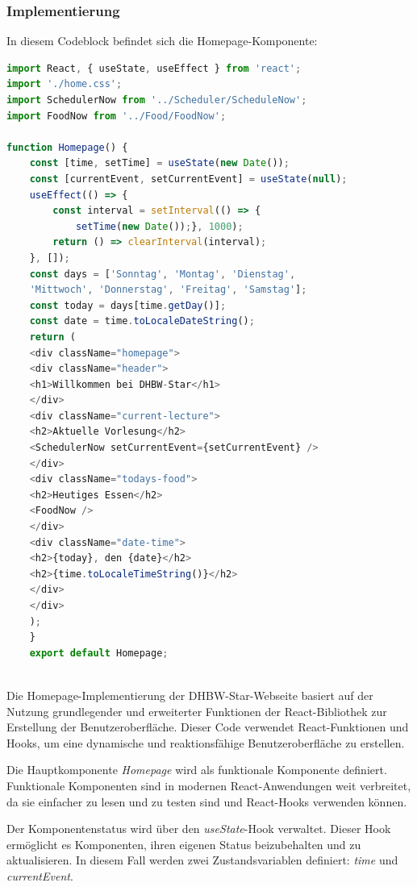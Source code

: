 \subsubsection{Implementierung}
In diesem Codeblock befindet sich die Homepage-Komponente:
\begin{lstlisting}[language=JavaScript,
	frame=single,           % Ein Rahmen um den Code
	framexleftmargin=15pt,  % Rahmen link von den Zahlen
	style=algoBericht,
	label={Homepage-Komponente},
	captionpos=b ,          % Caption unter den Code setzen
	caption={Homepage-Komponente}]
import React, { useState, useEffect } from 'react';
import './home.css';
import SchedulerNow from '../Scheduler/ScheduleNow';
import FoodNow from '../Food/FoodNow';

function Homepage() {
	const [time, setTime] = useState(new Date());
	const [currentEvent, setCurrentEvent] = useState(null);
	useEffect(() => {
		const interval = setInterval(() => {
			setTime(new Date());}, 1000);
		return () => clearInterval(interval);
	}, []);
	const days = ['Sonntag', 'Montag', 'Dienstag', 
	'Mittwoch', 'Donnerstag', 'Freitag', 'Samstag'];
	const today = days[time.getDay()];
	const date = time.toLocaleDateString();
	return (
	<div className="homepage">
	<div className="header">
	<h1>Willkommen bei DHBW-Star</h1>
	</div>
	<div className="current-lecture">
	<h2>Aktuelle Vorlesung</h2>
	<SchedulerNow setCurrentEvent={setCurrentEvent} />
	</div>
	<div className="todays-food">
	<h2>Heutiges Essen</h2>
	<FoodNow />
	</div>
	<div className="date-time">
	<h2>{today}, den {date}</h2>
	<h2>{time.toLocaleTimeString()}</h2>
	</div>
	</div>
	);
	}
	export default Homepage;
	
\end{lstlisting}

Die Homepage-Implementierung der DHBW-Star-Webseite basiert auf der Nutzung grundlegender und erweiterter Funktionen der React-Bibliothek zur Erstellung der Benutzeroberfläche. Dieser Code verwendet React-Funktionen und Hooks, um eine dynamische und reaktionsfähige Benutzeroberfläche zu erstellen.

Die Hauptkomponente \emph{Homepage} wird als funktionale Komponente definiert. Funktionale Komponenten sind in modernen React-Anwendungen weit verbreitet, da sie einfacher zu lesen und zu testen sind und React-Hooks verwenden können.

Der Komponentenstatus wird über den \emph{useState}-Hook verwaltet. Dieser Hook ermöglicht es Komponenten, ihren eigenen Status beizubehalten und zu aktualisieren. In diesem Fall werden zwei Zustandsvariablen definiert: \emph{time} und \emph{currentEvent}.

